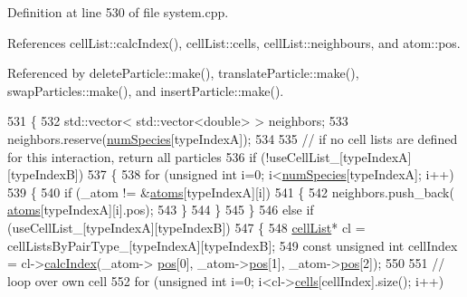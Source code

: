 Definition at line 530 of file system.\+cpp.



References cell\+List\+::calc\+Index(), cell\+List\+::cells, cell\+List\+::neighbours, and atom\+::pos.



Referenced by delete\+Particle\+::make(), translate\+Particle\+::make(), swap\+Particles\+::make(), and insert\+Particle\+::make().


\begin{DoxyCode}
531 \{
532                 std::vector< std::vector<double> > neighbors;
533                 neighbors.reserve(\hyperlink{classsim_system_a9eea865e6dc1cff377b1e79c4d9c23f0}{numSpecies}[typeIndexA]);
534                 
535                 \textcolor{comment}{// if no cell lists are defined for this interaction, return all particles}
536                 \textcolor{keywordflow}{if} (!useCellList\_[typeIndexA][typeIndexB])
537                 \{
538                                 \textcolor{keywordflow}{for} (\textcolor{keywordtype}{unsigned} \textcolor{keywordtype}{int} i=0; i<\hyperlink{classsim_system_a9eea865e6dc1cff377b1e79c4d9c23f0}{numSpecies}[typeIndexA]; i++)
539                                 \{
540                                                 \textcolor{keywordflow}{if} (\_atom != &\hyperlink{classsim_system_a90421b19082f7fb8fc23b7264b1161e4}{atoms}[typeIndexA][i])
541                                                 \{
542                                                                 neighbors.push\_back(
      \hyperlink{classsim_system_a90421b19082f7fb8fc23b7264b1161e4}{atoms}[typeIndexA][i].pos);
543                                                 \}
544                                 \}
545                 \}
546                 \textcolor{keywordflow}{else} \textcolor{keywordflow}{if} (useCellList\_[typeIndexA][typeIndexB])
547                 \{
548                                 \hyperlink{classcell_list}{cellList}* cl = cellListsByPairType\_[typeIndexA][typeIndexB];
549                                 \textcolor{keyword}{const} \textcolor{keywordtype}{unsigned} \textcolor{keywordtype}{int} cellIndex = cl->\hyperlink{classcell_list_aa6b843131cd487164a137571c7343cab}{calcIndex}(\_atom->
      \hyperlink{classatom_a3ae5f4880e7831d8b2c9fda72b4eb24a}{pos}[0], \_atom->\hyperlink{classatom_a3ae5f4880e7831d8b2c9fda72b4eb24a}{pos}[1], \_atom->\hyperlink{classatom_a3ae5f4880e7831d8b2c9fda72b4eb24a}{pos}[2]);
550 
551                                 \textcolor{comment}{// loop over own cell}
552                                 \textcolor{keywordflow}{for} (\textcolor{keywordtype}{unsigned} \textcolor{keywordtype}{int} i=0; i<cl->\hyperlink{classcell_list_a10bc0c3ae819293b1e88bc7d1bfdb2aa}{cells}[cellIndex].size(); i++)

\end{DoxyCode}
